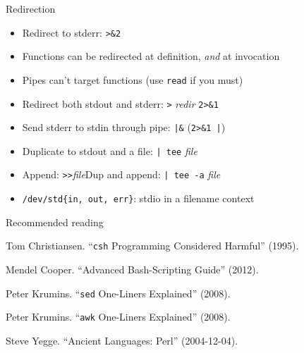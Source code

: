 \documentclass[mathserif,xcolor={dvipsnames,table}]{beamer}
\begin{document}
\begin{frame}{Redirection}
\begin{itemize}
\item Redirect to stderr: \texttt{>\&2}
\item Functions can be redirected at definition, \textit{and} at invocation
\item Pipes can't target functions (use \texttt{read} if you must)
\item Redirect both stdout and stderr: \texttt{>} \textit{redir} \texttt{2>\&1}
\item Send stderr to stdin through pipe: \texttt{|\&} (\texttt{2>\&1 |})
\item Duplicate to stdout and a file: \texttt{| tee} \textit{file}
\item Append: \texttt{>}\texttt{>}\textit{file}\hfill Dup and append: \texttt{| tee -a} \textit{file}
\item \texttt{/dev/std\{in, out, err\}}: stdio in a filename context
\end{itemize}
\end{frame}

\begin{frame}{Recommended reading}
\begin{itemize}
\small{
\item Tom Christiansen. ``\texttt{csh} Programming Considered Harmful'' (1995).
\item Mendel Cooper. ``Advanced Bash-Scripting Guide'' (2012).
\item Peter Krumins. ``\texttt{sed} One-Liners Explained'' (2008).
\item Peter Krumins. ``\texttt{awk} One-Liners Explained'' (2008).
\item Steve Yegge. ``Ancient Languages: Perl'' (2004-12-04).
}
\end{itemize}
\end{frame}
\end{document}
